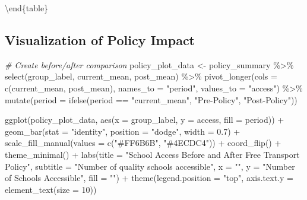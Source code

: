 \documentclass[
]{article}
\newenvironment{Shaded}{\begin{snugshade}}{\end{snugshade}}
\newcommand{\AttributeTok}[1]{\textcolor[rgb]{0.77,0.63,0.00}{#1}}
\newcommand{\CommentTok}[1]{\textcolor[rgb]{0.56,0.35,0.01}{\textit{#1}}}
\newcommand{\DecValTok}[1]{\textcolor[rgb]{0.00,0.00,0.81}{#1}}
\newcommand{\FloatTok}[1]{\textcolor[rgb]{0.00,0.00,0.81}{#1}}
\newcommand{\FunctionTok}[1]{\textcolor[rgb]{0.00,0.00,0.00}{#1}}
\newcommand{\NormalTok}[1]{#1}
\newcommand{\OtherTok}[1]{\textcolor[rgb]{0.56,0.35,0.01}{#1}}
\newcommand{\SpecialCharTok}[1]{\textcolor[rgb]{0.00,0.00,0.00}{#1}}
\newcommand{\StringTok}[1]{\textcolor[rgb]{0.31,0.60,0.02}{#1}}
\begin{document}
\textbackslash end\{table\}

\hypertarget{visualization-of-policy-impact}{%
\subsection{Visualization of Policy
Impact}\label{visualization-of-policy-impact}}

\begin{Shaded}
\begin{Highlighting}[]
\CommentTok{\# Create before/after comparison}
\NormalTok{policy\_plot\_data }\OtherTok{\textless{}{-}}\NormalTok{ policy\_summary }\SpecialCharTok{\%\textgreater{}\%}
  \FunctionTok{select}\NormalTok{(group\_label, current\_mean, post\_mean) }\SpecialCharTok{\%\textgreater{}\%}
  \FunctionTok{pivot\_longer}\NormalTok{(}\AttributeTok{cols =} \FunctionTok{c}\NormalTok{(current\_mean, post\_mean), }
               \AttributeTok{names\_to =} \StringTok{"period"}\NormalTok{, }
               \AttributeTok{values\_to =} \StringTok{"access"}\NormalTok{) }\SpecialCharTok{\%\textgreater{}\%}
  \FunctionTok{mutate}\NormalTok{(}\AttributeTok{period =} \FunctionTok{ifelse}\NormalTok{(period }\SpecialCharTok{==} \StringTok{"current\_mean"}\NormalTok{, }\StringTok{"Pre{-}Policy"}\NormalTok{, }\StringTok{"Post{-}Policy"}\NormalTok{))}

\FunctionTok{ggplot}\NormalTok{(policy\_plot\_data, }\FunctionTok{aes}\NormalTok{(}\AttributeTok{x =}\NormalTok{ group\_label, }\AttributeTok{y =}\NormalTok{ access, }\AttributeTok{fill =}\NormalTok{ period)) }\SpecialCharTok{+}
  \FunctionTok{geom\_bar}\NormalTok{(}\AttributeTok{stat =} \StringTok{"identity"}\NormalTok{, }\AttributeTok{position =} \StringTok{"dodge"}\NormalTok{, }\AttributeTok{width =} \FloatTok{0.7}\NormalTok{) }\SpecialCharTok{+}
  \FunctionTok{scale\_fill\_manual}\NormalTok{(}\AttributeTok{values =} \FunctionTok{c}\NormalTok{(}\StringTok{"\#FF6B6B"}\NormalTok{, }\StringTok{"\#4ECDC4"}\NormalTok{)) }\SpecialCharTok{+}
  \FunctionTok{coord\_flip}\NormalTok{() }\SpecialCharTok{+}
  \FunctionTok{theme\_minimal}\NormalTok{() }\SpecialCharTok{+}
  \FunctionTok{labs}\NormalTok{(}\AttributeTok{title =} \StringTok{"School Access Before and After Free Transport Policy"}\NormalTok{,}
       \AttributeTok{subtitle =} \StringTok{"Number of quality schools accessible"}\NormalTok{,}
       \AttributeTok{x =} \StringTok{""}\NormalTok{,}
       \AttributeTok{y =} \StringTok{"Number of Schools Accessible"}\NormalTok{,}
       \AttributeTok{fill =} \StringTok{""}\NormalTok{) }\SpecialCharTok{+}
  \FunctionTok{theme}\NormalTok{(}\AttributeTok{legend.position =} \StringTok{"top"}\NormalTok{,}
        \AttributeTok{axis.text.y =} \FunctionTok{element\_text}\NormalTok{(}\AttributeTok{size =} \DecValTok{10}\NormalTok{))}
\end{Highlighting}
\end{Shaded}
\end{document}
